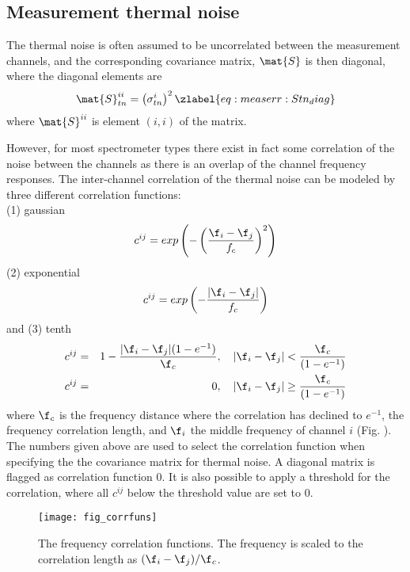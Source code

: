  \subsection{Measurement thermal noise}
 
 The thermal noise is often assumed to be uncorrelated between the
 measurement channels, and the corresponding covariance matrix,
 $\mat{S}$ is then diagonal, where the diagonal elements are
 \begin{equation}
   \mat{S}_{tn}^{ii} = \left( \sigma_{tn}^i \right)^2
  \zlabel{eq:measerr:Stn_diag}
 \end{equation}
 where $\mat{S}^{ii}$ is element $(i,i)$ of the matrix.
 
 However, for most spectrometer types there exist in fact some
 correlation of the noise between the channels as there is an overlap
 of the channel frequency responses.  The inter-channel correlation of
 the thermal noise can be modeled by three
 different correlation functions: \\ \noindent (1) gaussian
 \begin{equation}
  c^{ij} = exp\left(-\left(\frac{\f_i-\f_j}{f_c}\right)^2\right)
 \end{equation}
 (2) exponential
 \begin{equation}
  c^{ij} = exp\left(-\frac{|\f_i-\f_j|}{f_c}\right)
 \end{equation}
 and (3) tenth
 \begin{eqnarray}
  c^{ij} &=& 1-\frac{|\f_i-\f_j|(1-e^{-1})}{\f_c}, \quad 
            |\f_i-\f_j| < \frac{\f_c}{(1-e^{-1})} \nonumber \\
  c^{ij} &=& 0, \quad |\f_i-\f_j| \geq \frac{\f_c}{(1-e^{-1})}
 \end{eqnarray}
 where $\f_c$ is the frequency distance where the correlation has
 declined to $e^{-1}$, the frequency correlation length, and $\f_i$
 the middle frequency of channel $i$ (Fig. ).
 The numbers given above are used to select the correlation function
 when specifying the the covariance matrix for thermal noise. A
 diagonal matrix is flagged as correlation function 0. It is also
 possible to apply a threshold for the correlation, where all $c^{ij}$
 below the threshold value are set to 0.

 \begin{figure}
  \begin{center}
   \begin{minipage}[c]{0.65\textwidth}
    \centering
    \texttt{[image: fig\_corrfuns]}
   \end{minipage}%
   \hspace{0.03\textwidth}%
   \begin{minipage}[c]{0.30\textwidth}
    \centering
    \caption{The frequency correlation functions. The frequency is scaled to
             the correlation length as $(\f_i-\f_j)/\f_c$.}
   \end{minipage}
  \end{center}
 \end{figure}           
 
